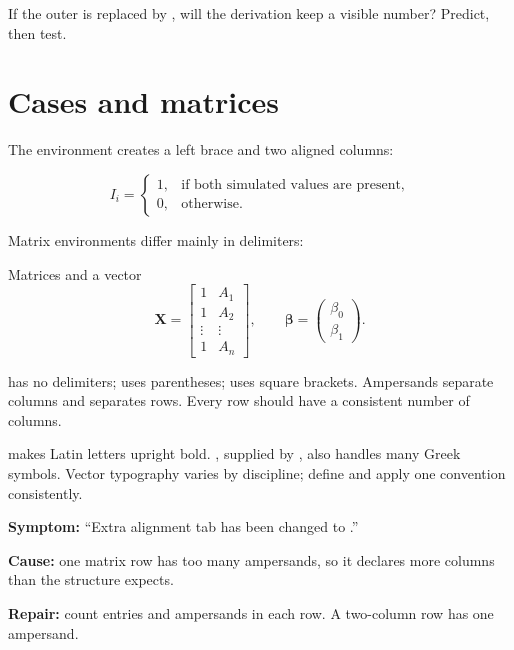 \begin{pausepredict}
If the outer  is replaced by \code{\textbackslash[ ...
\textbackslash]}, will the derivation keep a visible number? Predict, then test.
\end{pausepredict}

\section{Cases and matrices}

The  environment creates a left brace and two aligned columns:

\begin{equation}
  I_i =
  \begin{cases}
    1, & \text{if both simulated values are present},\\
    0, & \text{otherwise}.
  \end{cases}
  \label{eq:complete-pair-indicator}
\end{equation}

Matrix environments differ mainly in delimiters:

\begin{latexcode}{Matrices and a vector}
\[
  \mathbf{X} =
  \begin{bmatrix}
    1 & A_1 \\
    1 & A_2 \\
    \vdots & \vdots \\
    1 & A_n
  \end{bmatrix},
  \qquad
  \boldsymbol{\beta} =
  \begin{pmatrix}
    \beta_0 \\
    \beta_1
  \end{pmatrix}.
\]
\end{latexcode}

 has no delimiters;  uses parentheses;
 uses square brackets. Ampersands separate columns and
\code{\\} separates rows. Every row should have a consistent number of
columns.

 makes Latin letters upright bold. , supplied by
, also handles many Greek symbols. Vector typography varies by
discipline; define and apply one convention consistently.

\begin{commonerror}
\textbf{Symptom:} ``Extra alignment tab has been changed to .''

\textbf{Cause:} one matrix row has too many ampersands, so it declares more
columns than the structure expects.

\textbf{Repair:} count entries and ampersands in each row. A two-column row has
one ampersand.
\end{commonerror}

